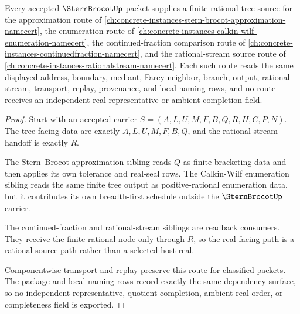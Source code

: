 \begin{theorem}
\label{thm:stern-brocot-l10-real-readback-route}
Every accepted $\SternBrocotUp$ packet supplies a finite rational-tree source for the approximation route of \autoref{ch:concrete-instances-stern-brocot-approximation-namecert}, the enumeration route of \autoref{ch:concrete-instances-calkin-wilf-enumeration-namecert}, the continued-fraction comparison route of \autoref{ch:concrete-instances-continuedfraction-namecert}, and the rational-stream source route of \autoref{ch:concrete-instances-rationalstream-namecert}. Each such route reads the same displayed address, boundary, mediant, Farey-neighbor, branch, output, rational-stream, transport, replay, provenance, and local naming rows, and no route receives an independent real representative or ambient completion field.
\end{theorem}
\begin{proof}
Start with an accepted carrier $S=(A,L,U,M,F,B,Q,R,H,C,P,N)$. The tree-facing data are exactly $A,L,U,M,F,B,Q$, and the rational-stream handoff is exactly $R$.

The Stern--Brocot approximation sibling reads $Q$ as finite bracketing data and then applies its own tolerance and real-seal rows. The Calkin-Wilf enumeration sibling reads the same finite tree output as positive-rational enumeration data, but it contributes its own breadth-first schedule outside the $\SternBrocotUp$ carrier.

The continued-fraction and rational-stream siblings are readback consumers. They receive the finite rational node only through $R$, so the real-facing path is a rational-source path rather than a selected host real.

Componentwise transport and replay preserve this route for classified packets. The package and local naming rows record exactly the same dependency surface, so no independent representative, quotient completion, ambient real order, or completeness field is exported.
\end{proof}

